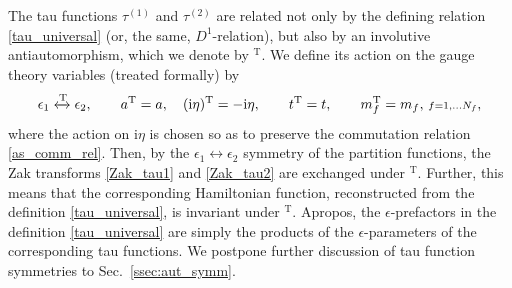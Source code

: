 \documentclass[12pt,a4paper]{article}
\numberwithin{equation}{section}
\newcommand{\ri}{\mathrm{i}}
\begin{document}
The tau functions $\tau^{(1)}$ and $\tau^{(2)}$ are related not only by the defining relation \eqref{tau_universal} (or, the same, $D^1$-relation), but also by an involutive antiautomorphism, which we denote by $^\mathrm{T}$. We define its action on the gauge theory variables (treated formally) by
\begin{equation}\label{aut_T}
\epsilon_1\xleftrightarrow[]{\mathrm{T}}\epsilon_2, \qquad a^{\mathrm{T}}=a, \quad (\ri\eta)^{\mathrm{T}}=-\ri \eta, \qquad t^{\mathrm{T}}=t, \qquad m_f^{\mathrm{T}}=m_f,\, {\scriptstyle f=1,\ldots N_f}, 
\end{equation}
where the action on $\ri\eta$ is chosen so as to preserve the commutation relation \eqref{as_comm_rel}. 
Then, by the $\epsilon_1\leftrightarrow\epsilon_2$ symmetry of the partition functions, the Zak transforms \eqref{Zak_tau1} and \eqref{Zak_tau2} are exchanged under $^\mathrm{T}$. Further, this means that the corresponding Hamiltonian function, reconstructed from the definition \eqref{tau_universal}, is invariant under $^\mathrm{T}$. 
Apropos, the $\epsilon$-prefactors in the definition \eqref{tau_universal} are simply the products of the $\epsilon$-parameters of the corresponding tau functions.
We postpone further discussion of tau function symmetries to Sec.~\ref{ssec:aut_symm}. 
\end{document}
